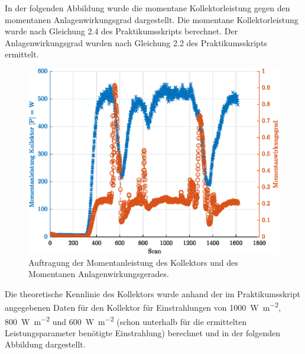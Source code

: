 In der folgenden Abbildung wurde die momentane Kollektorleistung gegen den momentanen Anlagenwirkungsgrad dargestellt. 
Die momentane Kollektorleistung wurde nach Gleichung 2.4 des Praktikumsskripts berechnet. Der Anlagenwirkungsgrad wurden nach Gleichung 2.2 des Praktikumsskripts ermittelt. 

\begin{figure}[H]
	\centering
	\includegraphics[height=0.3\textheight]{../DATA/LeistungTime.eps}
	\caption[Auftragung der Momentanleistung des Kollektors und des Momentanen Anlagenwirkungsgerades]{Auftragung der Momentanleistung des Kollektors und des Momentanen Anlagenwirkungsgerades.}
	\label{fig:Momentanleistung}
\end{figure}

Die theoretische Kennlinie des Kollektors wurde anhand der im Praktikumsskript angegebenen Daten für den Kollektor für Einstrahlungen von \SI{1000}{\watt\per\meter\squared}, \SI{800}{\watt\per\meter\squared} und \SI{600}{\watt\per\meter\squared} (schon unterhalb für die ermittelten Leistungsparameter benötigte Einstrahlung) berechnet und in der folgenden Abbildung dargestellt.

